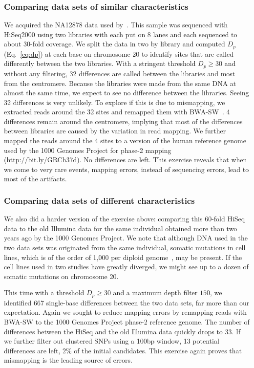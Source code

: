 \documentclass{bioinfo}
\begin{document}
\subsubsection{Comparing data sets of similar characteristics}
We acquired the NA12878 data used by~\citet{Depristo:2011vn}. This sample was sequenced
with HiSeq2000 using two libraries with each put on 8 lanes and each sequenced
to about 30-fold coverage.  We split the data in two by library and computed
$D_p$ (Eq.~\ref{eq:dp}) at each base on chromosome 20 to identify sites that
are called differently between the two libraries.  With a stringent threshold
$D_p\ge 30$ and without any filtering, 32 differences are called between
the libraries and most from the centromere. Because the libraries were made
from the same DNA at almost the same time, we expect to see no difference
between the libraries. Seeing 32 differences is very unlikely. To explore if
this is due to mismapping, we extracted reads around the 32 sites and remapped
them with BWA-SW~\citep{Li:2010fk}. 4 differences remain around the centromere,
implying that most of the differences between libraries are caused by the
variation in read mapping.  We further mapped the reads around the 4 sites to a
version of the human reference genome used by the 1000 Genomes Project for
phase-2 mapping (http://bit.ly/GRCh37d).  No differences
are left. This exercise reveals that when we come to very rare events,
mapping errors, instead of sequencing errors, lead to most of the artifacts.

\subsubsection{Comparing data sets of different characteristics}
We also did a harder version of the exercise above: comparing this 60-fold
HiSeq data to the old Illumina data for the same individual obtained more than
two years ago by the 1000 Genomes Project. We note that although DNA used in
the two data sets was originated from the same individual, somatic mutations in
cell lines, which is of the order of 1,000 per diploid
genome~\citep{Conrad:2011kx}, may be present. If the cell lines used in two
studies have greatly diverged, we might see up to a dozen of somatic mutations
on chromosome 20.

This time with a threshold $D_p\ge 30$ and a maximum depth filter $150$, we
identified 667 single-base differences between the two data sets, far more than
our expectation. Again we sought to reduce mapping errors by remapping reads
with BWA-SW to the 1000 Genomes Project phase-2 reference genome. The number of
differences between the HiSeq and the old Illumina data quickly drops to 33.
If we further filter out clustered SNPs using a 100bp window, 13 potential differences
are left, 2\% of the initial candidates. This exercise again proves that
mismapping is the leading source of errors.
\end{document}

